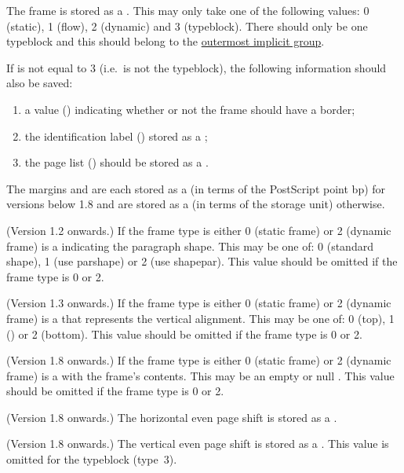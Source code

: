 \begin{numbered}
\item The frame  is stored as a . This may only
take one of the following values: 0 (static), 1 (flow), 2 (dynamic)
and 3 (\gls{typeblock}). There should only be one \gls{typeblock} and this
should belong to the \hyperref[jdr:object]{outermost implicit group}.

\item If  is not equal to 3 (i.e.\ is not the \gls{typeblock}), the following
information should also be saved:
  \begin{enumerate}
  \item a  value ()
  indicating whether or not the frame should have a border;
  \item the identification label () stored as a
  ;
  \item the page list () should be stored as a
  .
  \end{enumerate}

\item The margins    and
 are each stored as a  (in terms of the
PostScript point \gls{bp}) for versions below 1.8 and are stored
as a  (in terms of the storage unit) otherwise.

\item (Version 1.2 onwards.) If the frame type
is either 0 (static frame) or 2 (dynamic frame) 
is a  indicating the paragraph shape. This may be one of:
0 (standard shape), 1 (use \gls{parshape}) or 2 (use \gls{shapepar}).
This value should be omitted if the frame type is 0 or 2.

\item (Version 1.3 onwards.) If the frame type is
either 0 (static frame) or 2 (dynamic frame)  is a
 that represents the vertical alignment. This may be one
of: 0 (top), 1 () or 2 (bottom).
This value should be omitted if the frame type is 0 or 2.

\item (Version 1.8 onwards.)  If the frame type is
either 0 (static frame) or 2 (dynamic frame)  is a
 with the frame's contents. This may be an empty or
null .
This value should be omitted if the frame type is 0 or 2.

\item (Version 1.8 onwards.) The horizontal even page shift
 is stored as a .

\item (Version 1.8 onwards.) The vertical even page shift
 is stored as a . This value is
omitted for the \gls{typeblock} (type~3).

\end{numbered}%

